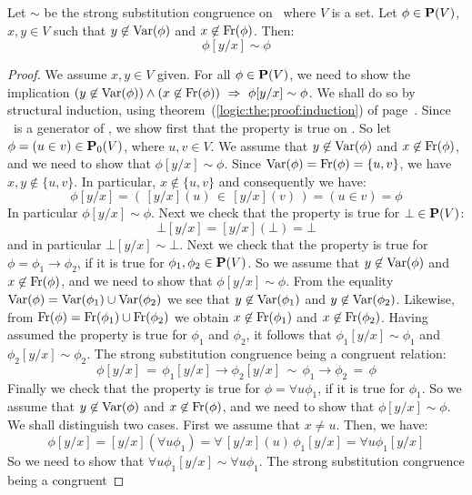 \begin{prop}\label{logic:prop:substitution:invariant}
Let $\sim$ be the strong substitution congruence on \pv\ where $V$
is a set. Let $\phi\in\mbox{${\bf P}(V)$}$, $x,y\in V$ such that
$y\not\in\mbox{\rm Var}(\phi)$ and $x\not\in\mbox{\rm Fr}(\phi)$. Then:
    \[
    \phi[y/x]\sim\phi
    \]
\end{prop}
\begin{proof}
We assume $x,y\in V$ given. For all $\phi\in\mbox{${\bf P}(V)$}$, we need to show
the implication $(y\not\in\mbox{\rm Var}(\phi))\land(x\not\in\mbox{\rm Fr}(\phi))\
\Rightarrow\ \phi[y/x]\sim\phi$. We shall do so by structural
induction, using theorem~(\ref{logic:the:proof:induction}) of
page~\pageref{logic:the:proof:induction}. Since \pvo\ is a generator
of \pv, we show first that the property is true on \pvo. So let
$\phi = (u\in v)\in\mbox{${\bf P}_{0}(V)$}$, where $u,v\in V$. We assume that
$y\not\in\mbox{\rm Var}(\phi)$ and $x\not\in\mbox{\rm Fr}(\phi)$, and we need to show
that $\phi[y/x]\sim\phi$. Since $\mbox{\rm Var}(\phi)=\mbox{\rm Fr}(\phi)=\{u,v\}$, we
have $x,y\not\in\{u,v\}$. In particular, $x\not\in\{u,v\}$ and
consequently we have:
    \[
    \phi[y/x]=(\,[y/x](u)\,\in\,[y/x](v)\,)=(u\in v)=\phi
    \]
In particular $\phi[y/x]\sim\phi$. Next we check that the property
is true for $\bot\in\mbox{${\bf P}(V)$}$:
    \[
    \bot[y/x]=[y/x](\bot)=\bot
    \]
and in particular $\bot[y/x]\sim\bot$. Next we check that the
property is true for $\phi=\phi_{1}\to\phi_{2}$, if it is true for
$\phi_{1},\phi_{2}\in\mbox{${\bf P}(V)$}$. So we assume that $y\not\in\mbox{\rm Var}(\phi)$
and $x\not\in\mbox{\rm Fr}(\phi)$, and we need to show that
$\phi[y/x]\sim\phi$. From the equality
$\mbox{\rm Var}(\phi)=\mbox{\rm Var}(\phi_{1})\cup\mbox{\rm Var}(\phi_{2})$ we see that
$y\not\in\mbox{\rm Var}(\phi_{1})$ and $y\not\in\mbox{\rm Var}(\phi_{2})$. Likewise,
from $\mbox{\rm Fr}(\phi)=\mbox{\rm Fr}(\phi_{1})\cup\mbox{\rm Fr}(\phi_{2})$ we obtain
$x\not\in\mbox{\rm Fr}(\phi_{1})$ and $x\not\in\mbox{\rm Fr}(\phi_{2})$. Having
assumed the property is true for $\phi_{1}$ and $\phi_{2}$, it
follows that $\phi_{1}[y/x]\sim\phi_{1}$ and
$\phi_{2}[y/x]\sim\phi_{2}$. The strong substitution congruence
being a congruent relation:
    \[
    \phi[y/x]\,=\,\phi_{1}[y/x]\to\phi_{2}[y/x]\,\sim\,\phi_{1}\to\phi_{2}\,=\,\phi
    \]
Finally we check that the property is true for $\phi=\forall
u\phi_{1}$, if it is true for $\phi_{1}$. So we assume that
$y\not\in\mbox{\rm Var}(\phi)$ and $x\not\in\mbox{\rm Fr}(\phi)$, and we need to show
that $\phi[y/x]\sim\phi$. We shall distinguish two cases. First we
assume that $x\neq u$. Then, we have:
    \[
    \phi[y/x]=[y/x](\forall u\phi_{1})=\forall\,[y/x](u)\,\phi_{1}[y/x]=\forall u\phi_{1}[y/x]
    \]
So we need to show that $\forall u\phi_{1}[y/x]\sim\forall
u\phi_{1}$. The strong substitution congruence being a congruent

\end{proof}
